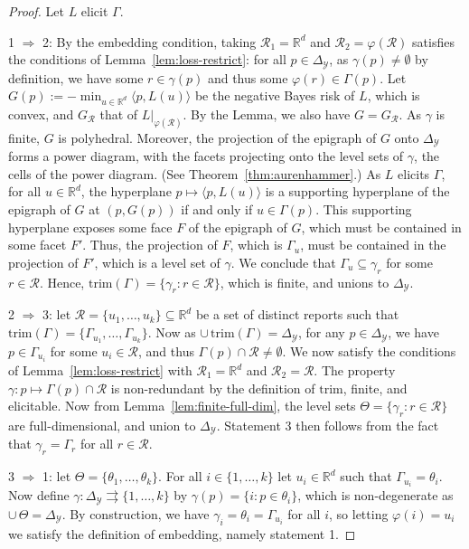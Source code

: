 \documentclass[12pt]{article}
\newcommand{\reals}{\mathbb{R}}
\newcommand{\simplex}{\Delta_\Y}
\newcommand{\R}{\mathcal{R}}
\newcommand{\Y}{\mathcal{Y}}
\newcommand{\inprod}[2]{\langle #1, #2 \rangle}%
\newcommand{\toto}{\rightrightarrows}
\newcommand{\trim}{\mathrm{trim}}
\begin{document}
\begin{proof}
  Let $L$ elicit $\Gamma$.

  1 $\Rightarrow$ 2:
  By the embedding condition, taking $\R_1 = \reals^d$ and $\R_2 = \varphi(\R)$ satisfies the conditions of Lemma~\ref{lem:loss-restrict}: for all $p\in\simplex$, as $\gamma(p) \neq \emptyset$ by definition, we have some $r\in\gamma(p)$ and thus some $\varphi(r) \in \Gamma(p)$.
  Let $G(p) := -\min_{u\in\reals^d} \inprod{p}{L(u)}$ be the negative Bayes risk of $L$, which is convex, and $G_{\R}$ that of $L|_{\varphi(\R)}$.
  By the Lemma, we also have $G = G_\R$.
  As $\gamma$ is finite, $G$ is polyhedral.
  Moreover, the projection of the epigraph of $G$ onto $\simplex$ forms a power diagram, with the facets projecting onto the level sets of $\gamma$, the cells of the power diagram.
  (See Theorem~\ref{thm:aurenhammer}.)
  As $L$ elicits $\Gamma$, for all $u\in\reals^d$, the hyperplane $p\mapsto \inprod{p}{L(u)}$ is a supporting hyperplane of the epigraph of $G$ at $(p,G(p))$ if and only if $u\in\Gamma(p)$.
  This supporting hyperplane exposes some face $F$ of the epigraph of $G$, which must be contained in some facet $F'$.
  Thus, the projection of $F$, which is $\Gamma_u$, must be contained in the projection of $F'$, which is a level set of $\gamma$.
  We conclude that $\Gamma_u \subseteq \gamma_r$ for some $r\in\R$.
  Hence, $\trim(\Gamma) = \{\gamma_r : r\in\R\}$, which is finite, and unions to $\simplex$.

  2 $\Rightarrow$ 3: let $\R = \{u_1,\ldots,u_k\} \subseteq\reals^d$ be a set of distinct reports such that $\trim(\Gamma) = \{\Gamma_{u_1},\ldots,\Gamma_{u_k}\}$.
  Now as $\cup\,\trim(\Gamma) = \simplex$, for any $p\in\simplex$, we have $p\in\Gamma_{u_i}$ for some $u_i\in\R$, and thus $\Gamma(p) \cap \R \neq \emptyset$.
  We now satisfy the conditions of Lemma~\ref{lem:loss-restrict} with $\R_1 = \reals^d$ and $\R_2 = \R$.
  The property $\gamma:p\mapsto\Gamma(p)\cap\R$ is non-redundant by the definition of $\trim$, finite, and elicitable.
  Now from Lemma~\ref{lem:finite-full-dim}, the level sets $\Theta = \{\gamma_r:r\in\R\}$ are full-dimensional, and union to $\simplex$.
  Statement 3 then follows from the fact that $\gamma_r = \Gamma_r$ for all $r\in\R$.

  3 $\Rightarrow$ 1: let $\Theta = \{\theta_1,\ldots,\theta_k\}$.
  For all $i\in\{1,\ldots,k\}$ let $u_i\in\reals^d$ such that $\Gamma_{u_i} = \theta_i$.
  Now define $\gamma:\simplex\toto\{1,\ldots,k\}$ by $\gamma(p) = \{i : p\in\theta_i\}$, which is non-degenerate as $\cup\,\Theta = \simplex$.
  By construction, we have $\gamma_i = \theta_i = \Gamma_{u_i}$ for all $i$, so letting $\varphi(i) = u_i$ we satisfy the definition of embedding, namely statement 1.
\end{proof}
\end{document}
